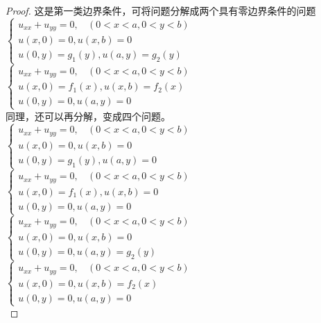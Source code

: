 \begin{proof} 这是第一类边界条件，可将问题分解成两个具有零边界条件的问题 \\
$\displaystyle \begin{cases}
	u_{xx} +u_{yy} =0 ,~~~~ (0<x<a, 0<y<b)\\
	u(x,0)= 0,  u(x,b)= 0 \\
	u(0,y)= g_1 (y) ,  u(a,y)= g_2 (y) 
\end{cases}$ \\
$\displaystyle \begin{cases}
	u_{xx} +u_{yy} =0 ,~~~~ (0<x<a, 0<y<b)\\
	u(x,0)= f_1 (x) ,  u(x,b)= f_2 (x) \\
	u(0,y)= 0,  u(a,y)= 0 
\end{cases}$ \\
同理，还可以再分解，变成四个问题。\\
$\displaystyle \begin{cases}
	u_{xx} +u_{yy} =0 ,~~~~ (0<x<a, 0<y<b)\\
	u(x,0)= 0,  u(x,b)= 0 \\
	u(0,y)= g_1 (y) ,  u(a,y)= 0
\end{cases}$ \\
$\displaystyle \begin{cases}
	u_{xx} +u_{yy} =0 ,~~~~ (0<x<a, 0<y<b)\\
	u(x,0)= f_1 (x) ,  u(x,b)= 0 \\
	u(0,y)= 0,  u(a,y)= 0 
\end{cases}$ \\
$\displaystyle \begin{cases}
	u_{xx} +u_{yy} =0 ,~~~~ (0<x<a, 0<y<b)\\
	u(x,0)= 0,  u(x,b)= 0 \\
	u(0,y)= 0,  u(a,y)= g_2 (y) 
\end{cases}$ \\
$\displaystyle \begin{cases}
	u_{xx} +u_{yy} =0 ,~~~~ (0<x<a, 0<y<b)\\
	u(x,0)= 0,  u(x,b)= f_2 (x) \\
	u(0,y)= 0,  u(a,y)= 0 
\end{cases}$ \\
\end{proof}

